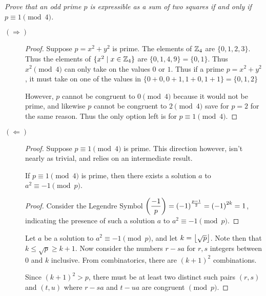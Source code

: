 \documentclass[12pt]{article}
\begin{document}
\newpage

\section{} \textit{Prove that an odd prime $p$ is expressible as a sum of two squares if and only if $p \equiv 1 \pmod{4}$.}

    \begin{description}
        \item[$(\Rightarrow)$]
        \begin{proof}
            Suppose $p = x^2 + y^2$ is prime. The elements of $\mathbb{Z}_4$ are $\{0, 1, 2, 3\}$. Thus the elements of $\{x^2 \mid x \in \mathbb{Z}_4\}$ are $\{0, 1, 4, 9\} = \{0, 1\}$. Thus $x^2 \pmod{4}$ can only take on the values $0$ or $1$. Thus if a prime $p = x^2 + y^2$, it must take on one of the values in $\{0 + 0, 0 + 1, 1 + 0, 1+ 1\} = \{0, 1, 2\}$

            However, $p$ cannot be congruent to $0 \pmod{4}$ because it would not be prime, and likewise $p$ cannot be congruent to $2 \pmod{4}$ save for $p = 2$ for the same reason. Thus the only option left is for $p \equiv 1 \pmod{4}$.
        \end{proof}

        \item[$(\Leftarrow)$]
        \begin{proof}
            Suppose $p \equiv 1 \pmod{4}$ is prime. This direction however, isn't nearly as trivial, and relies on an intermediate result.

            \begin{lemma}
                If $p \equiv 1 \pmod{4}$ is prime, then there exists a solution $a$ to $a^2 \equiv -1 \pmod{p}$.
            \end{lemma}

            \begin{proof}
                Consider the Legendre Symbol $\left(\dfrac{-1}{p}\right) = {(-1)}^{\frac{p - 1}{2}} = {(-1)}^{2k} = 1$, indicating the presence of such a solution $a$ to $a^2 \equiv -1 \pmod{p}$.
            \end{proof}

            Let $a$ be a solution to $a^2 \equiv -1 \pmod{p}$, and let $k = \left\lfloor \sqrt{p} \right\rfloor$. Note then that $k \leq \sqrt{p} \geq k + 1$. Now consider the numbers $r - sa$ for $r, s$ integers between $0$ and $k$ inclusive. From combinatorics, there are ${(k + 1)}^2$ combinations.

            Since ${(k + 1)}^2 > p$, there must be at least two distinct such pairs $(r, s)$ and $(t, u)$ where $r - sa$ and $t - ua$ are congruent $\pmod{p}$.


\end{proof}
\end{description}
\end{document}
